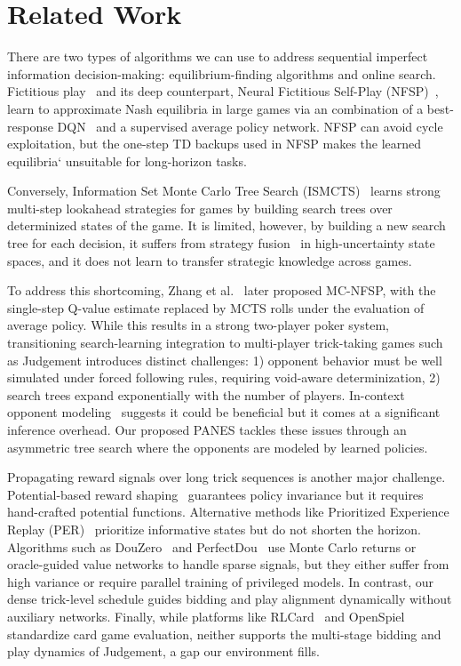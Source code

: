 \documentclass[conference]{IEEEtran}
\begin{document}
\section{\large \textbf{Related Work}}
There are two types of algorithms we can use to address sequential imperfect information decision-making: equilibrium-finding algorithms and online search. Fictitious play~\cite{brown1951iterative, robinson1951} and its deep counterpart, Neural Fictitious Self-Play (NFSP)~\cite{silver2016deep}, learn to approximate Nash equilibria in large games via an combination of a best-response DQN~\cite{mnih2015human} and a supervised average policy network. NFSP can avoid cycle exploitation, but the one-step TD backups used in NFSP makes the learned equilibria` unsuitable for long-horizon tasks. 

Conversely, Information Set Monte Carlo Tree Search (ISMCTS)~\cite{browne2012survey, cowling2012ismcts} learns strong multi-step lookahead strategies for games by building search trees over determinized states of the game. It is limited, however, by building a new search tree for each decision, it suffers from strategy fusion~\cite{frank1998search} in high-uncertainty state spaces, and it does not learn to transfer strategic knowledge across games.

To address this shortcoming, Zhang et al.~\cite{zhang2021mcnfsp} later proposed MC-NFSP, with the single-step Q-value estimate replaced by MCTS rolls under the evaluation of average policy. While this results in a strong two-player poker system, transitioning search-learning integration to multi-player trick-taking games such as Judgement introduces distinct challenges: 1) opponent behavior must be well simulated under forced following rules, requiring void-aware determinization, 2) search trees expand exponentially with the number of players.  In-context opponent modeling~\cite{opponentmodeling2024} suggests it could be beneficial but it comes at a significant inference overhead. Our proposed PANES tackles these issues through an asymmetric tree search where the opponents are modeled by learned policies.

Propagating reward signals over long trick sequences is another major challenge. Potential-based reward shaping~\cite{ng1999policy} guarantees policy invariance but it requires hand-crafted potential functions. Alternative methods like Prioritized Experience Replay (PER)~\cite{schaul2016prioritized} prioritize informative states but do not shorten the horizon. Algorithms such as DouZero~\cite{zha2021douzero} and PerfectDou~\cite{you2020perfectdou} use Monte Carlo returns or oracle-guided value networks to handle sparse signals, but they either suffer from high variance or require parallel training of privileged models. In contrast, our dense trick-level schedule guides bidding and play alignment dynamically without auxiliary networks. Finally, while platforms like RLCard~\cite{zha2021rlcard} and OpenSpiel~\cite{lanctot2019openspiel} standardize card game evaluation, neither supports the multi-stage bidding and play dynamics of Judgement, a gap our environment fills.
\end{document}
